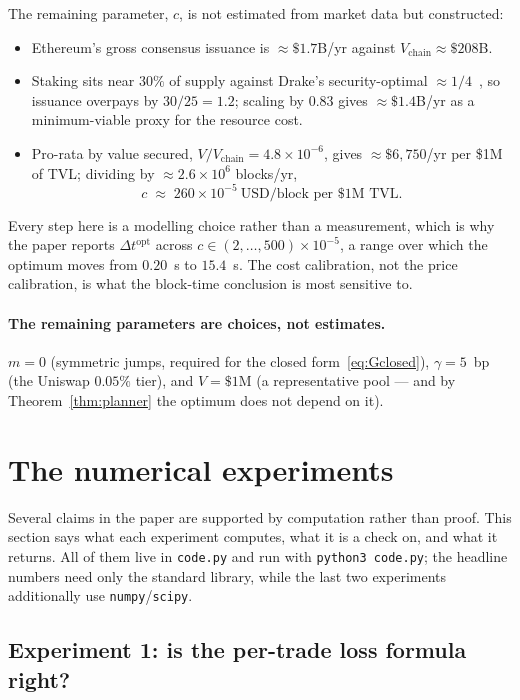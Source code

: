 \documentclass[11pt]{article}
\theoremstyle{definition}
\theoremstyle{remark}
\newcommand{\dt}{\Delta t}
\newcommand{\1}{\mathbf{1}}
\begin{document}
The remaining parameter, $c$, is not estimated from market data but constructed:
\begin{itemize}[leftmargin=2em]
\item Ethereum's gross consensus issuance is $\approx\$1.7$B/yr against $V_{\mathrm{chain}} \approx \$208$B.
\item Staking sits near $30\%$ of supply against Drake's security-optimal $\approx1/4$~\cite{drake2025croissant,elowsson2024endgame}, so issuance overpays by $30/25 = 1.2$; scaling by $0.83$ gives $\approx\$1.4$B/yr as a minimum-viable proxy for the resource cost.
\item Pro-rata by value secured, $V/V_{\mathrm{chain}} = 4.8\times10^{-6}$, gives $\approx\$6{,}750$/yr per \$1M of TVL; dividing by $\approx2.6\times10^6$ blocks/yr,
\[
c \;\approx\; 260\times10^{-5}\ \text{USD/block per \$1M TVL}.
\]
\end{itemize}
Every step here is a modelling choice rather than a measurement, which is why the paper reports $\dt^{\mathrm{opt}}$ across $c \in (2,\dots,500)\times10^{-5}$, a range over which the optimum moves from $0.20$~s to $15.4$~s. The cost calibration, not the price calibration, is what the block-time conclusion is most sensitive to.

\paragraph{The remaining parameters are choices, not estimates.} $m = 0$ (symmetric jumps, required for the closed form~\eqref{eq:Gclosed}), $\gamma = 5$~bp (the Uniswap $0.05\%$ tier), and $V = \$1$M (a representative pool --- and by Theorem~\ref{thm:planner} the optimum does not depend on it).

\section{The numerical experiments}\label{sec:experiments}

Several claims in the paper are supported by computation rather than proof. This section says what each experiment computes, what it is a check on, and what it returns. All of them live in \texttt{code.py} and run with \texttt{python3 code.py}; the headline numbers need only the standard library, while the last two experiments additionally use \texttt{numpy}/\texttt{scipy}.

\subsection{Experiment 1: is the per-trade loss formula right?}
\end{document}
